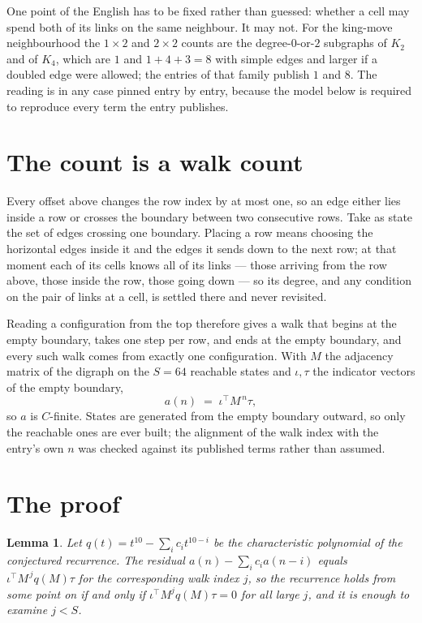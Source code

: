 \documentclass[11pt,a4paper]{article}
\theoremstyle{plain}
\newtheorem{lemma}[theorem]{Lemma}
\theoremstyle{definition}
\begin{document}
One point of the English has to be fixed rather than guessed: whether a cell may spend both of
its links on the same neighbour. It may not. For the king-move neighbourhood the $1\times2$
and $2\times2$ counts are the degree-$0$-or-$2$ subgraphs of $K_2$ and of $K_4$, which are $1$
and $1+4+3=8$ with simple edges and larger if a doubled edge were allowed; the entries of that
family publish $1$ and $8$. The reading is in any case pinned entry by entry, because the
model below is required to reproduce every term the entry publishes.


\section{The count is a walk count}

Every offset above changes the row index by at most one, so an edge either lies inside a row
or crosses the boundary between two consecutive rows. Take as state the set of edges crossing
one boundary. Placing a row means choosing the horizontal edges inside it and the edges it
sends down to the next row; at that moment each of its cells knows all of its links --- those
arriving from the row above, those inside the row, those going down --- so its degree, and any
condition on the pair of links at a cell, is settled there and never revisited.

Reading a configuration from the top therefore gives a walk that begins at the empty boundary,
takes one step per row, and ends at the empty boundary, and every such walk comes from exactly
one configuration. With $M$ the adjacency matrix of the digraph on the $S=64$ reachable
states and $\iota,\tau$ the indicator vectors of the empty boundary,
\[
a(n)\;=\;\iota^{\!\top}M^{\,n}\tau ,
\]
so $a$ is $C$-finite. States are generated from the empty boundary outward, so only the
reachable ones are ever built; the alignment of the walk index with the entry's own $n$ was
checked against its published terms rather than assumed.

\section{The proof}

\begin{lemma}\label{lem:crit}
Let $q(t)=t^{10}-\sum_i c_it^{10-i}$ be the characteristic polynomial of the
conjectured recurrence. The residual $a(n)-\sum_ic_ia(n-i)$ equals
$\iota^{\!\top}M^{\,j}q(M)\tau$ for the corresponding walk index $j$, so the recurrence
holds from some point on if and only if $\iota^{\!\top}M^{j}q(M)\tau=0$ for all large $j$,
and it is enough to examine $j<S$.
\end{lemma}
\end{document}
